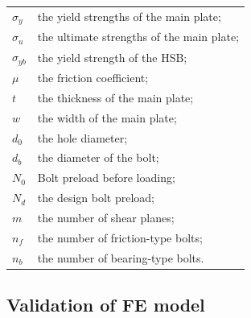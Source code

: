\begin{tabular}{ll}
$\sigma_y$ & the yield strengths of the main plate; \\
$\sigma_u$ & the ultimate strengths of the main plate;\\
$\sigma_{yb}$ & the yield strength of the HSB; \\ 
$\mu$ & the friction coefficient;\\ 
$t$ & the thickness of the main plate; \\ 
$w$ & the width of the main plate; \\
$d_0$ & the hole diameter; \\ 
$d_b$ & the diameter of the bolt; \\ 
$N_0$ & Bolt preload before loading; \\
$N_d$ & the design bolt preload; \\
$m$ & the number of shear planes; \\ 
$n_{f}$ & the number of friction-type bolts; \\ 
$n_b$ & the number of bearing-type bolts.
\end{tabular}


\subsection{Validation of FE model}
\label{sec-valid}


